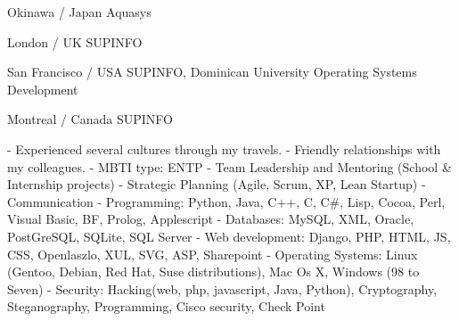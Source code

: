 \documentclass[english]{ecv}
\begin{document}
\begin{ecv}
\ecvBSub{\ecvLanguageTravels}

 {Okinawa / Japan}
                {Aquasys}

 {London / UK}
                {SUPINFO}

 {San Francisco / USA}
                {SUPINFO, Dominican University}
                {Operating Systems Development}

 {Montreal / Canada}
                {SUPINFO}

                { - Experienced several cultures through my travels.\ecvNewLine
                  - Friendly relationships with my colleagues.\ecvNewLine
                  - MBTI type: ENTP\ecvNewLine
                }
                {- Team Leadership and Mentoring (School \& Internship projects)
                 - Strategic Planning (Agile, Scrum, XP, Lean Startup)
                 - Communication
                }
                {- Programming: Python, Java, C++, C, C\#, Lisp, Cocoa, Perl,
                  Visual Basic, BF, Prolog, Applescript\ecvNewLine
                 - Databases: MySQL, XML, Oracle, PostGreSQL, SQLite, SQL
                 Server\ecvNewLine
                 - Web development: Django, PHP, HTML, JS, CSS, Openlaszlo, XUL,
                 SVG, ASP, Sharepoint\ecvNewLine
                 - Operating Systems: Linux (Gentoo, Debian, Red Hat, Suse
                 distributions), Mac Os X, Windows (98 to Seven)\ecvNewLine
                 - Security: Hacking(web, php, javascript, Java, Python),
                 Cryptography, Steganography, Programming, Cisco security, Check Point}


\end{ecv}
\end{document}
